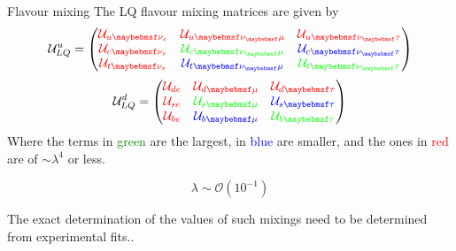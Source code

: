 \documentclass[9pt,usenames,dvipsnames]{beamer}
\begin{document}
\begin{frame}{Flavour mixing }
	The  LQ flavour mixing matrices are given by
	\[ \mathcal U^u_{LQ}=
	\begin{pmatrix}
	\textcolor{red}{\mathcal U_{u\nu_e}} & \textcolor{red}{\mathcal U_{u\nu_\mu}} & \textcolor{red}{\mathcal U_{u\nu_\tau} } \\
	\textcolor{red}{\mathcal U_{c\nu_e}} & \textcolor{green}{\mathcal U_{c\nu_\mu}} &  \textcolor{blue}{\mathcal U_{c\nu_\tau}}\\
	\textcolor{red}{\mathcal U_{t\nu_e}} & \textcolor{blue}{\mathcal U_{t\nu_\mu}} &  \textcolor{green}{\mathcal U_{t\nu_\tau}}
	\end{pmatrix}
	\] 
	\[ \mathcal U^d_{LQ}=
	\begin{pmatrix}
	\textcolor{red}{\mathcal U_{d e}} & \textcolor{red}{\mathcal U_{d \mu}} & \textcolor{red}{\mathcal U_{d \tau} } \\
	\textcolor{red}{\mathcal U_{s e}} & \textcolor{green}{\mathcal U_{s\mu}} &  \textcolor{blue}{\mathcal U_{s\tau}}\\
	\textcolor{red}{\mathcal U_{be}} & \textcolor{blue}{\mathcal U_{b\mu}} &  \textcolor{green}{\mathcal U_{b\tau}}
	\end{pmatrix}
	\] 
	Where the terms in \textcolor{green}{green} are the largest, in \textcolor{blue}{blue} are smaller, and the ones in \textcolor{red}{red} are of $ \sim \lambda^4$ or less. \\
	\begin{center}
		\[\lambda \sim \mathcal O(10^{-1}) \]
	\end{center}
	The exact determination of the values of such mixings need to be determined from experimental fits..
\end{frame}
\end{document}
